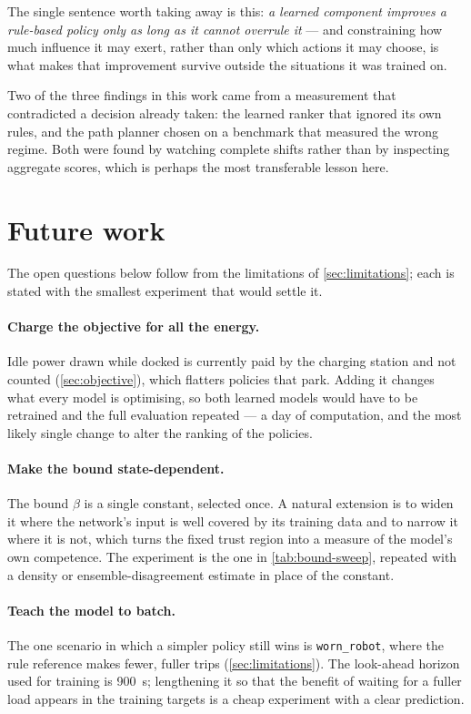 The single sentence worth taking away is this: \emph{a learned component improves a rule-based
policy only as long as it cannot overrule it} --- and constraining how much influence it may
exert, rather than only which actions it may choose, is what makes that improvement survive
outside the situations it was trained on.

Two of the three findings in this work came from a measurement that contradicted a decision already
taken: the learned ranker that ignored its own rules, and the path planner chosen on a benchmark
that measured the wrong regime. Both were found by watching complete shifts rather than by
inspecting aggregate scores, which is perhaps the most transferable lesson here.

\section{Future work}
\label{sec:future-work}

The open questions below follow from the limitations of \cref{sec:limitations}; each is stated with
the smallest experiment that would settle it.

\paragraph{Charge the objective for all the energy.}
Idle power drawn while docked is currently paid by the charging station and not counted
(\cref{sec:objective}), which flatters policies that park. Adding it changes what every model is
optimising, so both learned models would have to be retrained and the full evaluation repeated ---
a day of computation, and the most likely single change to alter the ranking of the policies.

\paragraph{Make the bound state-dependent.}
The bound $\beta$ is a single constant, selected once. A natural extension is to widen it where the
network's input is well covered by its training data and to narrow it where it is not, which turns
the fixed trust region into a measure of the model's own competence. The experiment is the one in
\cref{tab:bound-sweep}, repeated with a density or ensemble-disagreement estimate in place of the
constant.

\paragraph{Teach the model to batch.}
The one scenario in which a simpler policy still wins is \texttt{worn\_robot}, where the rule
reference makes fewer, fuller trips (\cref{sec:limitations}). The look-ahead horizon used for
training is \SI{900}{\second}; lengthening it so that the benefit of waiting for a fuller load
appears in the training targets is a cheap experiment with a clear prediction.

